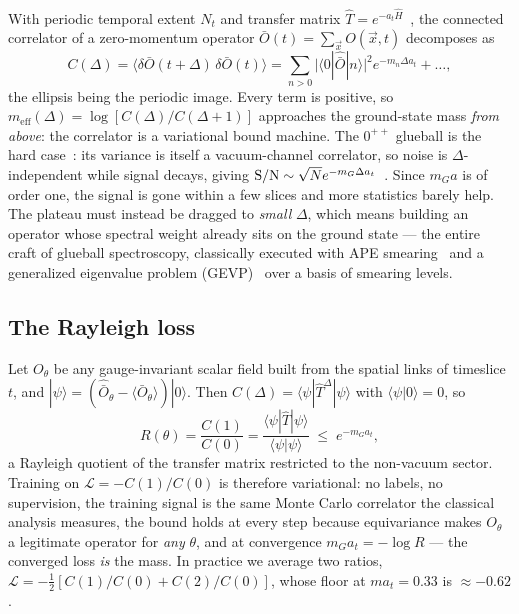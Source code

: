 \documentclass[aps,prl,reprint,superscriptaddress,nofootinbib]{revtex4-2}
\newcommand{\Obar}{\bar{O}}
\newcommand{\meff}{m_{\mathrm{eff}}}
\newcommand{\at}{a_t}
\newcommand{\That}{\hat{T}}
\begin{document}
With periodic temporal extent $N_t$ and transfer matrix
$\That=e^{-\at\hat H}$~\cite{OsterwalderSeiler1978}, the connected correlator of
a zero-momentum operator $\Obar(t)=\sum_{\vec x}O(\vec x,t)$ decomposes as
\begin{equation}
  C(\Delta)=\big\langle\delta\Obar(t{+}\Delta)\,\delta\Obar(t)\big\rangle
  =\sum_{n>0}\big|\langle0|\hat{\bar O}|n\rangle\big|^2 e^{-m_n\Delta\at}+\dots,
  \label{eq:spectral}
\end{equation}
the ellipsis being the periodic image. Every term is positive, so
$\meff(\Delta)=\log[C(\Delta)/C(\Delta{+}1)]$ approaches the ground-state mass
\emph{from above}: the correlator is a variational bound machine. The $0^{++}$
glueball is the hard case~\cite{Berg1980}: its variance is itself a vacuum-channel
correlator, so noise is $\Delta$-independent while signal decays, giving
${\rm S/N}\sim\sqrt{N}e^{-m_G\Delta\at}$~\cite{Lepage1989}. Since $m_G a$ is of
order one, the signal is gone within a few slices and more statistics barely
help. The plateau must instead be dragged to \emph{small} $\Delta$, which means
building an operator whose spectral weight already sits on the ground state ---
the entire craft of glueball spectroscopy, classically executed with APE
smearing~\cite{APE1987} and a generalized eigenvalue problem
(GEVP)~\cite{MichaelTeasdale1983,LuscherWolff1990,Blossier2009,MorningstarPeardon1999}
over a basis of smearing levels.

\subsection{The Rayleigh loss}

Let $O_\theta$ be any gauge-invariant scalar field built from the spatial links
of timeslice $t$, and $|\psi\rangle=(\hat{\bar O}_\theta-\langle\Obar_\theta\rangle)|0\rangle$.
Then $C(\Delta)=\langle\psi|\That^\Delta|\psi\rangle$ with
$\langle\psi|0\rangle=0$, so
\begin{equation}
  R(\theta)=\frac{C(1)}{C(0)}
  =\frac{\langle\psi|\That|\psi\rangle}{\langle\psi|\psi\rangle}\;\le\;e^{-m_G\at},
  \label{eq:rayleigh}
\end{equation}
a Rayleigh quotient of the transfer matrix restricted to the non-vacuum sector.
Training on $\mathcal{L}=-C(1)/C(0)$ is therefore variational: no labels, no
supervision, the training signal is the same Monte Carlo correlator the
classical analysis measures, the bound holds at every step because equivariance
makes $O_\theta$ a legitimate operator for \emph{any} $\theta$, and at
convergence $m_G\at=-\log R$ --- the converged loss \emph{is} the mass. In
practice we average two ratios,
$\mathcal{L}=-\frac12[C(1)/C(0)+C(2)/C(0)]$, whose floor at $m\at=0.33$ is
$\approx-0.62$.
\end{document}
